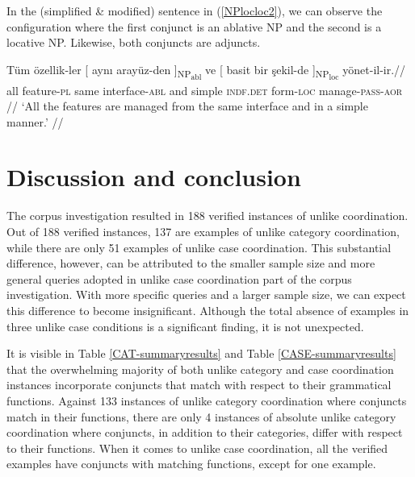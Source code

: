In the (simplified \& modified) sentence in (\ref{NPlocloc2}), we can observe the configuration where the first conjunct is an ablative NP and the second is a locative NP. Likewise, both conjuncts are adjuncts.

\pex[glspace=!1em,everygla={},everyglb={},aboveglbskip=-.15ex, interpartskip=15pt]
\label{NPlocloc2} \begingl
\gla Tüm özellik-ler {[} aynı {arayüz-den ]\textsubscript{NP\textsubscript{abl}}} ve {[} basit bir {şekil-de ]\textsubscript{NP\textsubscript{loc}}} yönet-il-ir.//
\glb all feature-\textsc{pl} same interface-\textsc{abl} and simple \textsc{indf.det} form-\textsc{loc} manage-\textsc{pass}-\textsc{aor} //
\glft `All the features are managed from the same interface and in a simple manner.' //
\endgl
\xe 

\section{Discussion and conclusion} \label{sec:corp disc and concl}

The corpus investigation resulted in 188 verified instances of unlike coordination. Out of 188 verified instances, 137 are examples of unlike category coordination, while there are only 51 examples of unlike case coordination. This substantial difference, however, can be attributed to the smaller sample size and more general queries adopted in unlike case coordination part of the corpus investigation. With more specific queries and a larger sample size, we can expect this difference to become insignificant. Although the total absence of examples in three unlike case conditions is a significant finding, it is not unexpected.

It is visible in Table \ref{CAT-summaryresults} and Table \ref{CASE-summaryresults} that the overwhelming majority of both unlike category and case coordination instances incorporate conjuncts that match with respect to their grammatical functions. Against 133 instances of unlike category coordination where conjuncts match in their functions, there are only 4 instances of absolute unlike category coordination where conjuncts, in addition to their categories, differ with respect to their functions. When it comes to unlike case coordination, all the verified examples have conjuncts with matching functions, except for one example.


